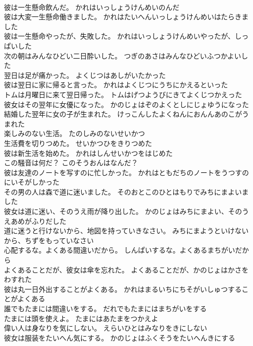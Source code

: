 \documentclass[8pt]{extreport}
\begin{document}
\begin{CJK}{UTF8}{min}
\\	彼は一生懸命飲んだ。	かれはいっしょうけんめいのんだ 
\\	彼は大変一生懸命働きました。	かれはたいへんいっしょうけんめいはたらきました 
\\	彼は一生懸命やったが、失敗した。	かれはいっしょうけんめいやったが、しっぱいした 
\\	次の朝はみんなひどい二日酔いした。	つぎのあさはみんなひどいふつかよいした 
\\	翌日は足が痛かった。	よくじつはあしがいたかった 
\\	彼は翌日に家に帰ると言った。	かれはよくじつにうちにかえるといった 
\\	トムは月曜日に来て翌日帰った。	トムはげつようびにきてよくじつかえった 
\\	彼女はその翌年に女優になった。	かのじょはぞのよくとしにじょゆうになった 
\\	結婚した翌年に女の子が生まれた。	けっこんしたよくねんにおんんあのこがうまれた 
\\	楽しみのない生活。	たのしみのないせいかつ 
\\	生活費を切りつめた。	せいかつひをきりつめた 
\\	彼は新生活を始めた。	かれはしんせいかつをはじめた 
\\	この騒音は何だ？	このそうおんはなんだ？ 
\\	彼は友達のノートを写すのに忙しかった。	かれはともだちのノートをうつすのにいそがしかった 
\\	その男の人は森で道に迷いました。	そのおとこのひとはもりでみちにまよいました 
\\	彼女は道に迷い、そのうえ雨が降り出した。	かのじょはみちにまよい、そのうえあめがふりだした 
\\	道に迷うと行けないから、地図を持っていきなさい。	みちにまようといけないから、ちずをもっていなさい 
\\	心配するな。よくある間違いだから。	しんぱいするな。よくあるまちがいだから 
\\	よくあることだが、彼女は傘を忘れた。	よくあることだが、かのじょはかさをわすれた 
\\	彼は丸一日外出することがよくある。	かれはまるいちにちそがいしゅつすることがよくある 
\\	誰でもたまには間違いをする。	だれでもたまにはまちがいをする 
\\	たまには頭を使えよ。	たまにはあたまをつかえよ 
\\	偉い人は身なりを気にしない。	えらいひとはみなりをきにしない 
\\	彼女は服装をたいへん気にする。	かのじょはふくそうをたいへんきにする 

\end{CJK}
\end{document}

